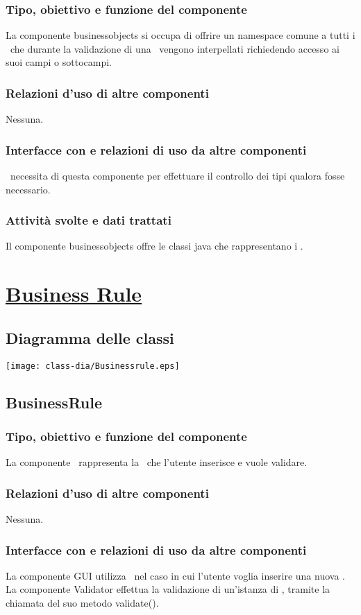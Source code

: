 \subsubsection{Tipo, obiettivo e funzione del componente}
La componente businessobjects si occupa di offrire un namespace comune a tutti i \bos\ che durante la validazione di una \br\ vengono interpellati richiedendo accesso ai suoi campi o sottocampi.
\subsubsection{Relazioni d'uso di altre componenti}
Nessuna.
\subsubsection{Interfacce con e relazioni di uso da altre componenti}
\brp\ necessita di questa componente per effettuare il controllo dei tipi qualora fosse necessario.
\subsubsection{Attivit\`a svolte e dati trattati}
Il componente businessobjects offre le classi java che rappresentano i \bos.

\section{\underline{Business Rule}}
\subsection{Diagramma delle classi}
\begin{center}
\texttt{[image: class-dia/Businessrule.eps]}
\end{center}
\subsection{BusinessRule}
\subsubsection{Tipo, obiettivo e funzione del componente}
La componente \BR\ rappresenta la \br\ che l'utente inserisce e vuole validare.
\subsubsection{Relazioni d'uso di altre componenti}
Nessuna.
\subsubsection{Interfacce con e relazioni di uso da altre componenti}
La componente GUI utilizza \BR\ nel caso in cui l'utente voglia inserire una nuova \br.
La componente Validator effettua la validazione di un'istanza di \BR, tramite la chiamata del suo metodo validate().
